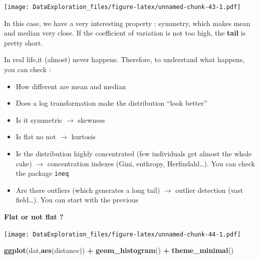 \documentclass[
]{book}
\newenvironment{Shaded}{\begin{snugshade}}{\end{snugshade}}
\newcommand{\DataTypeTok}[1]{\textcolor[rgb]{0.13,0.29,0.53}{#1}}
\newcommand{\DecValTok}[1]{\textcolor[rgb]{0.00,0.00,0.81}{#1}}
\newcommand{\KeywordTok}[1]{\textcolor[rgb]{0.13,0.29,0.53}{\textbf{#1}}}
\newcommand{\NormalTok}[1]{#1}
\newcommand{\OperatorTok}[1]{\textcolor[rgb]{0.81,0.36,0.00}{\textbf{#1}}}
\newcommand{\StringTok}[1]{\textcolor[rgb]{0.31,0.60,0.02}{#1}}
\providecommand{\tightlist}{%
  \setlength{\itemsep}{0pt}\setlength{\parskip}{0pt}}
\begin{document}
\texttt{[image: DataExploration\_files/figure-latex/unnamed-chunk-43-1.pdf]}

In this case, we have a very interesting property : symmetry, which makes mean and median very close. If the coefficient of variation is not too high, the \textbf{tail} is pretty short.

In real life,it (almost) never happens. Therefore, to understand what happens, you can check :

\begin{itemize}
\tightlist
\item
  How different are mean and median
\item
  Does a log transformation make the distribution ``look better''
\item
  Is it symmetric \(\rightarrow\) skewness
\item
  Is flat no not \(\rightarrow\) kurtosis
\item
  Is the distribution highly concentrated (few individuals get almost the whole cake) \(\rightarrow\) concentration indexes (Gini, enthropy, Herfindahl\ldots). You can check the package \texttt{ineq}
\item
  Are there outliers (which generates a long tail) \(\rightarrow\) outlier detection (vast field\ldots). You can start with the previous
\end{itemize}

\textbf{Flat or not flat ?}

\begin{Shaded}
\end{Shaded}

\texttt{[image: DataExploration\_files/figure-latex/unnamed-chunk-44-1.pdf]}

\begin{Shaded}
\begin{Highlighting}[]
\KeywordTok{ggplot}\NormalTok{(dat,}\KeywordTok{aes}\NormalTok{(distance)) }\OperatorTok{+}\StringTok{ }\KeywordTok{geom_histogram}\NormalTok{() }\OperatorTok{+}\StringTok{ }\KeywordTok{theme_minimal}\NormalTok{()}
\end{Highlighting}
\end{Shaded}
\end{document}
